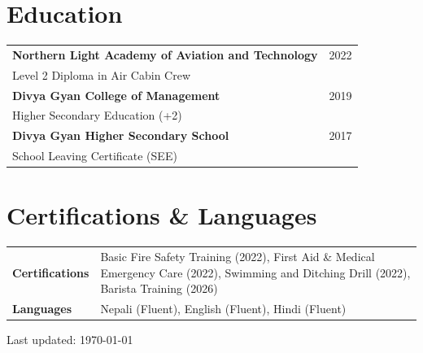 \documentclass[a4paper,11pt]{article}
\begin{document}
\section{Education}
\begin{tabularx}{\linewidth}{@{}X l@{}}
\textbf{Northern Light Academy of Aviation and Technology} & 2022 \\
Level 2 Diploma in Air Cabin Crew & \\
\textbf{Divya Gyan College of Management} & 2019 \\
Higher Secondary Education (+2) & \\ 
\textbf{Divya Gyan Higher Secondary School} & 2017 \\
School Leaving Certificate (SEE) & \\
\end{tabularx}

\section{Certifications \& Languages}
\begin{tabularx}{\linewidth}{@{}l X@{}}
\textbf{Certifications} & \normalsize{Basic Fire Safety Training (2022), First Aid \& Medical Emergency Care (2022), Swimming and Ditching Drill (2022), Barista Training (2026)} \\
\textbf{Languages} & \normalsize{Nepali (Fluent), English (Fluent), Hindi (Fluent)} \\
\end{tabularx}



\begin{center}
\footnotesize Last updated: \today
\end{center}
\end{document}
